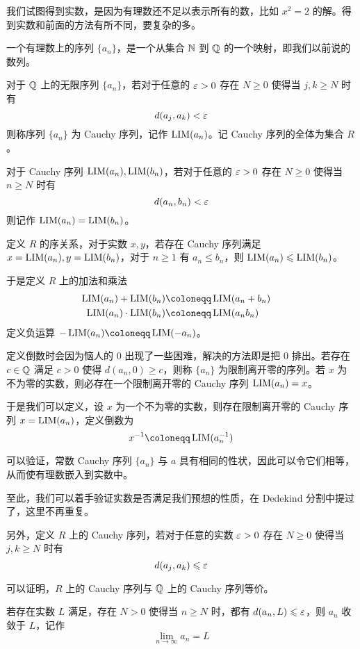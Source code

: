 我们试图得到实数，是因为有理数还不足以表示所有的数，比如 $x^2=2$ 的解。得到实数和前面的方法有所不同，要复杂的多。

一个有理数上的序列 $\{a_n\}$，是一个从集合 $\mathbb{N}$ 到 $\mathbb{Q}$ 的一个映射，即我们以前说的数列。

对于 $\mathbb{Q}$ 上的无限序列 $\{a_n\}$，若对于任意的 $\varepsilon > 0$ 存在 $N \geqslant 0$ 使得当 $j,k \geqslant N$ 时有
$$d(a_j,a_k) < \varepsilon$$
则称序列 $\{a_n\}$ 为 Cauchy 序列，记作 $\operatorname{{LIM}}(a_n)$。记 Cauchy 序列的全体为集合 $R$。

对于 Cauchy 序列 $\operatorname{{LIM}}(a_n),\operatorname{{LIM}}(b_n)$，若对于任意的 $\varepsilon > 0$ 存在 $N \geqslant 0$ 使得当 $n \geqslant N$ 时有
$$d(a_n,b_n) < \varepsilon$$
则记作 $\operatorname{{LIM}}(a_n) = \operatorname{{LIM}}(b_n)$。

定义 $R$ 的序关系，对于实数 $x,y$，若存在 Cauchy 序列满足 $x=\operatorname{{LIM}}(a_n),y=\operatorname{{LIM}}(b_n)$，对于 $n\geqslant 1$ 有 $a_n \leqslant b_n$，则 $\operatorname{{LIM}}(a_n) \leqslant \operatorname{{LIM}}(b_n)$。

于是定义 $R$ 上的加法和乘法
\[ \begin{aligned}
	\LIM(a_n) + \LIM(b_n)     & \coloneqq  \LIM(a_n+b_n) & \\
	\LIM(a_n) \cdot \LIM(b_n) & \coloneqq  \LIM(a_nb_n)    \\
\end{aligned} \]
定义负运算 $-\LIM(a_n) \coloneqq  \LIM(-a_n)$。

定义倒数时会因为恼人的 $0$ 出现了一些困难，解决的方法即是把 $0$ 排出。若存在 $c\in \mathbb{Q}$ 满足 $c > 0$ 使得 $d(a_n,0) \geqslant c$，则称 $\{a_n\}$ 为限制离开零的序列。若 $x$ 为不为零的实数，则必存在一个限制离开零的 Cauchy 序列 $\operatorname{{LIM}}(a_n) = x$。

于是我们可以定义，设 $x$ 为一个不为零的实数，则存在限制离开零的 Cauchy 序列 $x=\operatorname{{LIM}}(a_n)$，定义倒数为
$$x^{-1} \coloneqq  \LIM(a_n^{-1})$$

可以验证，常数 Cauchy 序列 $\{a_n\}$ 与 $a$ 具有相同的性状，因此可以令它们相等，从而使有理数嵌入到实数中。

至此，我们可以着手验证实数是否满足我们预想的性质，在 Dedekind 分割中提过了，这里不再重复。

另外，定义 $R$ 上的 Cauchy 序列，若对于任意的实数 $\varepsilon > 0$ 存在 $N \geqslant 0$ 使得当 $j,k \geqslant N$ 时有
$$d(a_j,a_k) \leqslant \varepsilon$$

可以证明，$R$ 上的 Cauchy 序列与 $\mathbb{Q}$ 上的 Cauchy 序列等价。

若存在实数 $L$ 满足，存在 $N>0$ 使得当 $n \geqslant N$ 时，都有 $d(a_n,L) \leqslant \varepsilon$，则 $a_n$ 收敛于 $L$，记作
$$\lim_{n\to \infty} a_n = L$$

